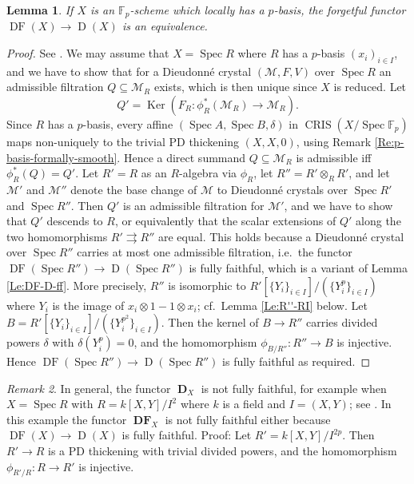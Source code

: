 \documentclass[a4paper,11pt]{article}
\theoremstyle{plain}
\newtheorem{Lemma}{Lemma}
\theoremstyle{definition}
\theoremstyle{remark}
\newtheorem{Remark}[Lemma]{Remark}
\theoremstyle{definition}
\numberwithin{Lemma}{section}
\numberwithin{Subpoint}{Lemma}
\numberwithin{equation}{section}
\newcommand{\MMM}{\mathcal{M}}
\newcommand{\DD}{{\mathbb{D}}}
\newcommand{\FF}{{\mathbb{F}}}
\DeclareMathOperator{\Dcat}{D}
\DeclareMathOperator{\Dfun}{\mathbf D} %
\DeclareMathOperator{\DFcat}{DF}
\DeclareMathOperator{\DFfun}{\mathbf{DF}} %
\DeclareMathOperator{\CRIS}{CRIS}
\DeclareMathOperator{\Ker}{Ker}
\DeclareMathOperator{\Spec}{Spec}
\newcommand{\chang}[1]{{#1}}
\begin{document}
\begin{Lemma}
\label{Le:DF-D-eq}
\chang{If $X$ is an $\FF_p$-scheme which locally has a $p$-basis,} 
the forgetful functor $\DFcat(X)\to\Dcat(X)$ is an equivalence.
\end{Lemma}

\begin{proof}
See \cite[Prop.~2.5.2]{Jong:Crystalline}.
We may assume that $X=\Spec R$ where $R$ has a $p$-basis $(x_i)_{i\in I}$,
and we have to show that for a Dieudonn\'e crystal $(\MMM,F,V)$
over $\Spec R$ an admissible filtration $Q\subseteq\MMM_R$ exists,
which is then unique since $X$ is reduced.
Let 
\[
Q'=\Ker(F_R:\phi_R^*(\MMM_R)\to\MMM_R).
\]
Since $R$ has a $p$-basis, every affine $(\Spec A,\Spec B,\delta)$ 
in $\CRIS(X/\Spec\FF_p)$ maps non-uniquely
to the trivial PD thickening $(X,X,0)$, 
\chang{using Remark \ref{Re:p-basis-formally-smooth}.}
Hence a direct summand $Q\subseteq\MMM_R$ is admissible iff
$\phi_R^*(Q)=Q'$.
Let $R'=R$ as an $R$-algebra via $\phi_R$,
let $R''=R'\otimes_RR'$, and let $\MMM'$ and
$\MMM''$ denote the base change of $\MMM$  
to Dieudonn\'e crystals over $\Spec R'$ and $\Spec R''$.
Then $Q'$ is an admissible
filtration for $\MMM'$, and we have to show that $Q'$ descends
to $R$, or equivalently that the scalar extensions of $Q'$
\chang{along} the two homomorphisms $R'\rightrightarrows R''$ are equal.
This holds because a Dieudonn\'e crystal over $\Spec R''$ carries
at most one admissible filtration, i.e.\
the functor $\DFcat(\Spec R'')\to \Dcat(\Spec R'')$
is fully faithful, which is a variant of Lemma \ref{Le:DF-D-ff}.
More precisely, $R''$ is isomorphic to 
$R'[\{Y_i\}_{i\in I}]/(\{Y_i^p\}_{i\in I})$
where $Y_i$ is the image of $x_i\otimes1-1\otimes x_i$; 
cf.\ Lemma \ref{Le:R''-RI} below.
Let $B=R'[\{Y_i\}_{i\in I}]/(\{Y_i^{p^2}\}_{i\in I})$.
Then the kernel of $B\to R''$ carries divided powers $\delta$
with $\delta(Y_i^p)=0$, 
and the homomorphism $\phi_{B/R''}:R''\to B$ is injective.
Hence $\DFcat(\Spec R'')\to\Dcat(\Spec R'')$ is fully faithful as required.
\end{proof}

\begin{Remark}
In general, the functor $\Dfun_X$ is not fully faithful, 
for example when $X=\Spec R$ with $R=k[X,Y]/I^2$ 
where $k$ is a field and $I=(X,Y)$; see \cite{Berthelot-Ogus}.
In this example the functor $\DFfun_X$ is not fully faithful either
because $\DFcat(X)\to\Dcat(X)$ is fully faithful.
Proof: Let $R'=k[X,Y]/I^{2p}$.
Then $R'\to R$ is a PD thickening with trivial divided powers,
and the homomorphism $\phi_{R'/R}:R\to R'$ is injective.
\end{Remark}
\end{document}
